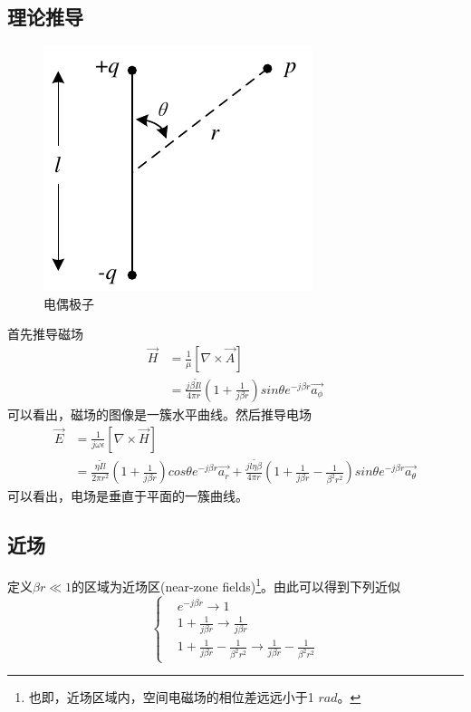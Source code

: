 \documentclass[lang=cn,11pt]{elegantpaper}
\begin{document}
\subsection{理论推导}
\begin{figure}[ht]
  \centering
  \includegraphics[width=0.3\linewidth]{figure//Hertzian_Dipole.pdf}
  \vspace{-0.3cm}
  \caption{电偶极子}\label{fig:Hertazian_Dipole}
\end{figure}
首先推导磁场\cite{B1,B2}
\begin{equation}
  \begin{aligned}
    \vec{H} &= \frac{1}{\mu}\left[\nabla\times \vec{A} \right] \\
            & = \frac{j\beta \widetilde{I}l}{4\pi r}\left(1 + \frac{1}{j\beta r}\right)sin \theta {} e^{-j\beta r} \vec{a_{\phi}}
\end{aligned}
\end{equation}
可以看出，磁场的图像是一簇水平曲线。然后推导电场
\begin{equation}
  \begin{aligned}
    \vec{E} &= \frac{1}{j\omega \epsilon}\left[\nabla \times \vec{H}\right] \\
    &= \frac{\eta \widetilde{I}l}{2\pi r^2}\left(1 + \frac{1}{j\beta r} \right)cos\theta e^{-j\beta r}\vec{a_r}+\frac{j\widetilde{l\eta \beta}}{4\pi r}\left(1+\frac{1}{j\beta r} - \frac{1}{{\beta}^2r^2}\right)sin\theta e^{-j\beta r}\vec{a_{\theta}}
  \end{aligned}
\end{equation}
可以看出，电场是垂直于平面的一簇曲线。
\subsection{近场}
定义$\beta r \ll 1$的区域为近场区(near-zone fields)\footnote{也即，近场区域内，空间电磁场的相位差远远小于1 $rad$。}。由此可以得到下列近似
\begin{equation}
  \left\{\begin{aligned}
    & e^{-j\beta r}\rightarrow 1 \\
    & 1 + \frac{1}{j\beta r} \rightarrow \frac{1}{j\beta r} \\
    & 1 + \frac{1}{j\beta r} - \frac{1}{{\beta}^2 r^2} \rightarrow \frac{1}{j\beta r} - \frac{1}{{\beta}^2 r^2}
  \end{aligned}\right.
\end{equation}
\end{document}
